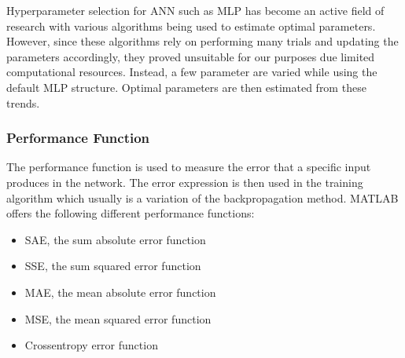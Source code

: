 Hyperparameter selection for ANN such as MLP has become an active field of research with various algorithms being used to estimate optimal parameters\cite{bergstra2011algorithms}. However, since these algorithms rely on performing many trials and updating the parameters accordingly, they proved unsuitable for our purposes due limited computational resources. Instead, a few parameter are varied while using the default MLP structure. Optimal parameters are then estimated from these trends.
%
%
%

 \subsubsection{Performance Function}

 The performance function is used to measure the error that a specific input produces in the network. The error expression is then used in the training algorithm which usually is a variation of the backpropagation method\cite{hecht1988theory}. MATLAB offers the following different performance functions:

 \begin{itemize}
 	\item SAE, the sum absolute error function
 	\item SSE, the sum squared error function
 	\item MAE, the mean absolute error function
 	\item MSE, the mean squared error function
 	\item Crossentropy error function
 \end{itemize}

